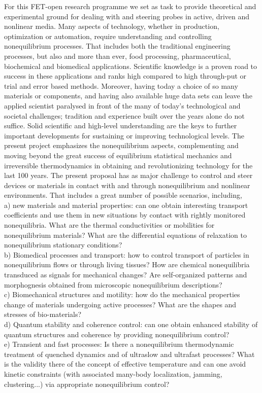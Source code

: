 For this FET-open research programme we set as task to provide theoretical and experimental
ground for dealing with and steering probes in active, driven and nonlinear media.  Many
aspects of technology, whether in production, optimization or automation, require
understanding and controlling nonequilibrium processes.  That includes both the traditional
engineering processes, but also and more than ever, food processing, pharmaceutical,
biochemical and biomedical applications.  Scientific knowledge is a proven road
to success in these applications and ranks high compared to high through-put or trial and error
based methods.  Moreover, having today a choice of so many materials or components, and
having also available huge data sets can leave the applied scientist paralysed in front of
the many of today's technological and societal challenges; tradition and experience built
over the years alone do not suffice.  Solid scientific and high-level understanding are the
keys to further important developments for sustaining or improving technological levels.
The present project emphasizes the nonequilibrium aspects, complementing and moving beyond
the great success of equilibrium statistical mechanics and irreversible thermodynamics in
obtaining and revolutionizing technology for the last 100 years.
The present proposal has as major challenge to control and steer devices or materials in contact with and through nonequilibrium and nonlinear environments.  That includes a great number of possible scenarios, including,\\
a) new materials and material properties:  can one obtain interesting transport coefficients and use them in new situations by contact with rightly monitored nonequilibria.  What are the thermal conductivities or mobilities for nonequilibrium materials?  What are the differential equations of relaxation to nonequilibrium stationary conditions?\\
b) Biomedical processes and transport: how to control transport of particles in nonequilibrium flows or through living tissues?  How are chemical nonequilibria transduced as signals for mechanical changes? Are self-organized patterns and morphognesis obtained from microscopic nonequilibrium descriptions?\\
c) Biomechanical structures and motility: how do the mechanical properties change of materials undergoing active processes?  What are the shapes and stresses of bio-materials?\\
d) Quantum stability and coherence control: can one obtain enhanced stability of quantum structures and coherence by providing nonequilibrium control?\\
e) Transient and fast processes: Is there a nonequilibrium thermodynamic treatment of quenched dynamics and of ultraslow and ultrafast processes?  What is the validity there of the concept of effective temperature and can one avoid kinetic constraints (with associated many-body localization, jamming, clustering...) via appropriate nonequilibrium control?\\



